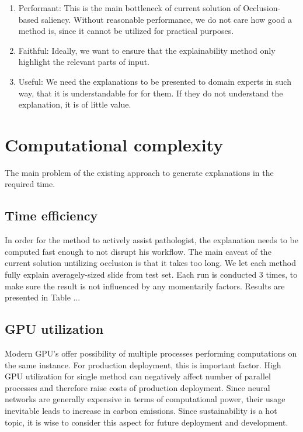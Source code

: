 \begin{enumerate}
    \item Performant: This is the main bottleneck of current solution of Occlusion-based saliency. Without reasonable performance, we do not care how good a method is, since it cannot be utilized for practical purposes.
    \item Faithful: Ideally, we want to ensure that the explainability method only highlight the relevant parts of input.
    \item Useful: We need the explanations to be presented to domain experts in such way, that it is understandable for for them. If they do not understand the explanation, it is of little value. 
\end{enumerate}

\section{Computational complexity}

The main problem of the existing approach to generate explanations in the required time.

\subsection*{Time efficiency}

In order for the method to actively assist pathologist, the explanation needs to be computed fast enough to not disrupt his workflow. The main caveat of the current solution untilizing occlusion is that it takes too long. We let each method fully explain averagely-sized slide from test set. Each run is conducted 3 times, to make sure the result is not influenced by any momentarily factors. Results are presented in Table ...

\subsection*{GPU utilization}

Modern GPU's offer possibility of multiple processes performing computations on the same instance. For production deployment, this is important factor. High GPU utilization for single method can negatively affect number of parallel processes and therefore raise costs of production deployment. Since neural networks are generally expensive in terms of computational power, their usage inevitable leads to increase in carbon emissions. Since sustainability is a hot topic, it is wise to consider this aspect for future deployment and development.

